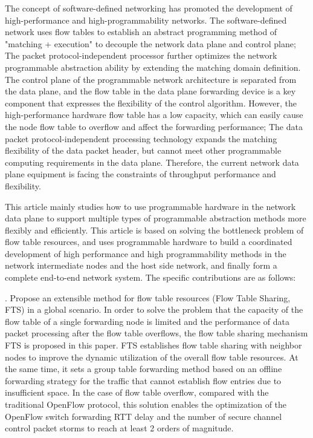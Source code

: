 %
\noindent The concept of software-defined networking has promoted the development of high-performance and high-programmability networks.
The software-defined network uses flow tables to establish an abstract programming method of "matching + execution" to decouple the network data plane and control plane;
The packet protocol-independent processor further optimizes the network programmable abstraction ability by extending the matching domain definition.
The control plane of the programmable network architecture is separated from the data plane, and the flow table in the data plane forwarding device is a key component that expresses the flexibility of the control algorithm. However, the high-performance hardware flow table has a low capacity, which can easily cause the node flow table to overflow and affect the forwarding performance;
The data packet protocol-independent processing technology expands the matching flexibility of the data packet header, but cannot meet other programmable computing requirements in the data plane. Therefore, the current network data plane equipment is facing the constraints of throughput performance and flexibility.\newline

\noindent This article mainly studies how to use programmable hardware in the network data plane to support multiple types of programmable abstraction methods more flexibly and efficiently.
This article is based on solving the bottleneck problem of flow table resources, and uses programmable hardware to build a coordinated development of high performance and high programmability methods in the network intermediate nodes and the host side network, and finally form a complete end-to-end network system.
The specific contributions are as follows:\newline


. Propose an extensible method for flow table resources (Flow Table Sharing, FTS) in a global scenario.
In order to solve the problem that the capacity of the flow table of a single forwarding node is limited and the performance of data packet processing after the flow table overflows, the flow table sharing mechanism FTS is proposed in this paper.
FTS establishes flow table sharing with neighbor nodes to improve the dynamic utilization of the overall flow table resources. At the same time, it sets a group table forwarding method based on an offline forwarding strategy for the traffic that cannot establish flow entries due to insufficient space.
In the case of flow table overflow, compared with the traditional OpenFlow protocol, this solution enables the optimization of the OpenFlow switch forwarding RTT delay and the number of secure channel control packet storms to reach at least 2 orders of magnitude.\newline

